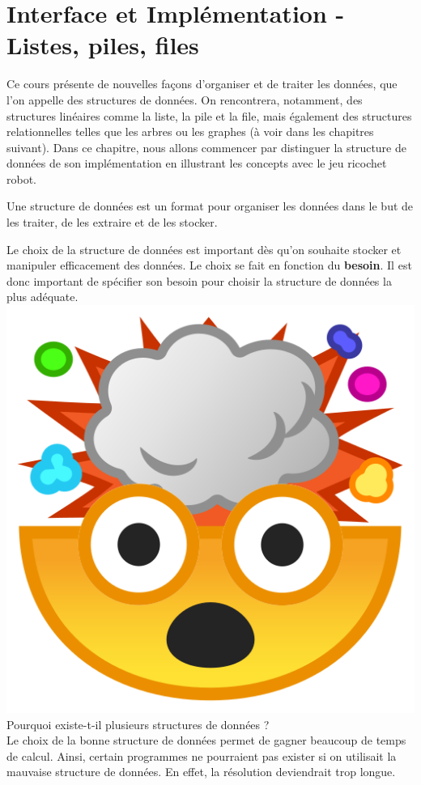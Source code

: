 \chapter{Interface et Implémentation - Listes, piles, files}
Ce cours présente de nouvelles façons d'organiser et de traiter les données, que l'on appelle des structures de données. On rencontrera, notamment, des structures linéaires comme la liste, la pile et la file, mais également des structures relationnelles telles que les arbres ou les graphes (à voir dans les chapitres suivant). Dans ce chapitre, nous allons commencer par distinguer la structure de données de son implémentation en illustrant les concepts avec le jeu ricochet robot.\\

\begin{tcolorbox}[enhanced,
    colback=green!25!black!10!white,colframe=green!75!black,title=Structure de données,
    drop fuzzy shadow,watermark color=white]
    Une structure de données est un format pour organiser les données dans le but de les traiter, de les extraire et de les stocker. 
  \end{tcolorbox}


Le choix de la structure de données est important dès qu'on souhaite stocker et manipuler efficacement des données. Le choix se fait en fonction du \textbf{besoin}. Il est donc important de spécifier son besoin pour choisir la structure de données la plus adéquate.\\

\includegraphics[scale=0.03]{Common_blob/mindblow.png}{\selectfont
Pourquoi existe-t-il plusieurs structures de données ?\\
}
Le choix de la bonne structure de données permet de gagner beaucoup de temps de calcul. Ainsi, certain programmes ne pourraient pas exister si on utilisait la mauvaise structure de données. En effet, la résolution deviendrait trop longue.\\



